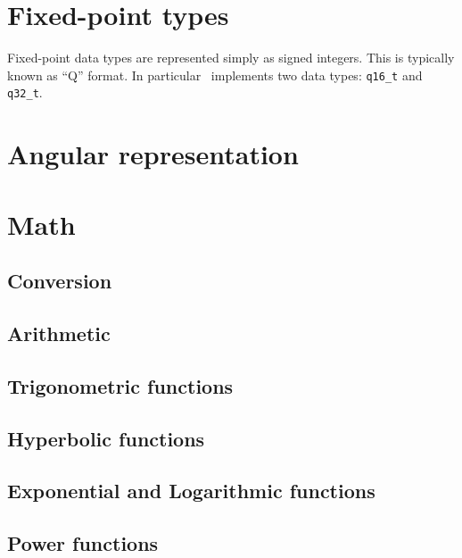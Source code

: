 % 
%

\newpage
\section{Fixed-point types}
\label{section:fpm:types}
%
Fixed-point data types are represented simply as signed integers.
This is typically known as ``Q'' format.
In particular \liquid\ implements two data types:
{\tt q16\_t} and {\tt q32\_t}.

% 
%
\section{Angular representation}
\label{section:fpm:angles}

% 
%
\section{Math}
\label{section:fpm:math}

\subsection{Conversion}
\label{section:fpm:math:conversion}

\subsection{Arithmetic}
\label{section:fpm:math:arithmetic}

\subsection{Trigonometric functions}
\label{section:fpm:math:trig}

\subsection{Hyperbolic functions}
\label{section:fpm:math:hyperbolic}

\subsection{Exponential and Logarithmic functions}
\label{section:fpm:math:explog}

\subsection{Power functions}
\label{section:fpm:math:power}

